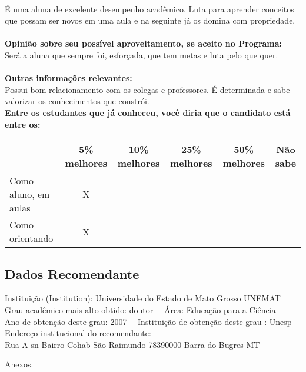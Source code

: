 \documentclass[11pt]{article}
\begin{document}
\\É uma aluna de excelente desempenho acadêmico. Luta para aprender conceitos que possam ser novos em uma aula e na seguinte já os domina com propriedade.\\
\\
\textbf{Opinião sobre seu possível aproveitamento, se aceito no Programa:}
\\Será a aluna que sempre foi, esforçada, que tem metas e luta pelo que quer.\\ 
\\
\textbf{Outras informações relevantes:} \\Possui bom relacionamento com os colegas e professores. É determinada e sabe valorizar os conhecimentos que constrói.
\\[0.3cm]
\textbf{Entre os estudantes que já conheceu, você diria que o candidato está entre os:}
\\
\begin{tabular}{|l|c|c|c|c|c|}
\hline
 & 5\% melhores & 10\% melhores & 25\% melhores & 50\% melhores & Não sabe \\
\hline
Como aluno, em aulas & X &  &  &  & \\
\hline
Como orientando & X &  &  &  & \\
\hline
\end{tabular}
\subsection*{Dados Recomendante} 
	Instituição (Institution): Universidade do Estado de Mato Grosso   UNEMAT
\\ 
	Grau acadêmico mais alto obtido: doutor
	\ \ Área: Educação para a Ciência
	\\
	Ano de obtenção deste grau: 2007
	\ \ 
	Instituição de obtenção deste grau : Unesp
	\\ 
	Endereço institucional do recomendante: \\ Rua A sn Bairro Cohab São Raimundo
78390000 Barra do Bugres  MT 
\begin{center}
Anexos.
\end{center}
\end{document}
